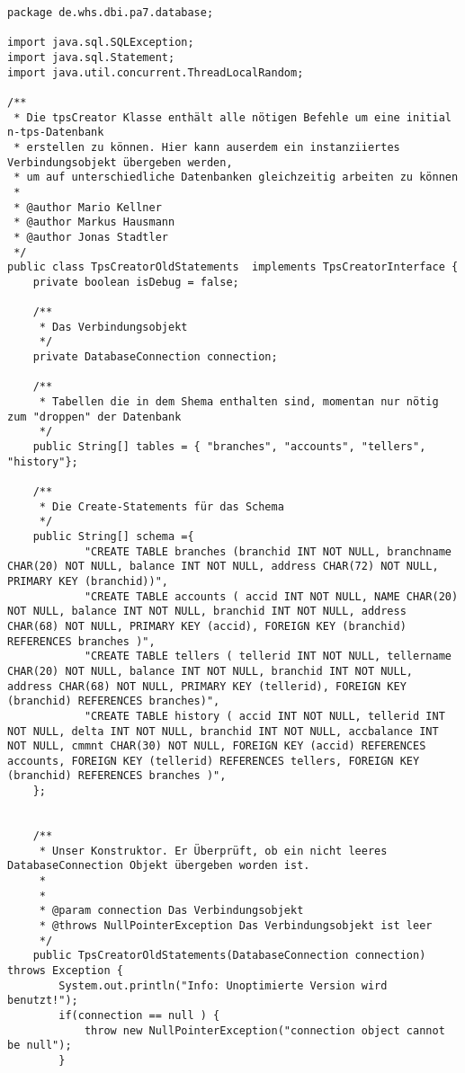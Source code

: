 \begin{lstlisting}[caption={TpsCreatorOldStatements (optimiert)}, label={lst:tpsoldv2}]
package de.whs.dbi.pa7.database;

import java.sql.SQLException;
import java.sql.Statement;
import java.util.concurrent.ThreadLocalRandom;

/**
 * Die tpsCreator Klasse enthält alle nötigen Befehle um eine initial n-tps-Datenbank
 * erstellen zu können. Hier kann auserdem ein instanziiertes Verbindungsobjekt übergeben werden,
 * um auf unterschiedliche Datenbanken gleichzeitig arbeiten zu können
 * 
 * @author Mario Kellner
 * @author Markus Hausmann
 * @author Jonas Stadtler
 */
public class TpsCreatorOldStatements  implements TpsCreatorInterface {
	private boolean isDebug = false;
	
	/**
	 * Das Verbindungsobjekt
	 */
	private DatabaseConnection connection;
	
	/**
	 * Tabellen die in dem Shema enthalten sind, momentan nur nötig zum "droppen" der Datenbank
	 */
	public String[] tables = { "branches", "accounts", "tellers", "history"};
	
	/**
	 * Die Create-Statements für das Schema
	 */
	public String[] schema ={
			"CREATE TABLE branches (branchid INT NOT NULL, branchname CHAR(20) NOT NULL, balance INT NOT NULL, address CHAR(72) NOT NULL, PRIMARY KEY (branchid))",
			"CREATE TABLE accounts ( accid INT NOT NULL, NAME CHAR(20) NOT NULL, balance INT NOT NULL, branchid INT NOT NULL, address CHAR(68) NOT NULL, PRIMARY KEY (accid), FOREIGN KEY (branchid) REFERENCES branches )",
			"CREATE TABLE tellers ( tellerid INT NOT NULL, tellername CHAR(20) NOT NULL, balance INT NOT NULL, branchid INT NOT NULL, address CHAR(68) NOT NULL, PRIMARY KEY (tellerid), FOREIGN KEY (branchid) REFERENCES branches)",
			"CREATE TABLE history ( accid INT NOT NULL, tellerid INT NOT NULL, delta INT NOT NULL, branchid INT NOT NULL, accbalance INT NOT NULL, cmmnt CHAR(30) NOT NULL, FOREIGN KEY (accid) REFERENCES accounts, FOREIGN KEY (tellerid) REFERENCES tellers, FOREIGN KEY (branchid) REFERENCES branches )",
	};
	
	
	/**
	 * Unser Konstruktor. Er Überprüft, ob ein nicht leeres DatabaseConnection Objekt übergeben worden ist.
	 * 
	 * 
	 * @param connection Das Verbindungsobjekt
	 * @throws NullPointerException Das Verbindungsobjekt ist leer 
	 */
	public TpsCreatorOldStatements(DatabaseConnection connection) throws Exception {
		System.out.println("Info: Unoptimierte Version wird benutzt!");
		if(connection == null ) {
			throw new NullPointerException("connection object cannot be null");
		}
		

\end{lstlisting}

